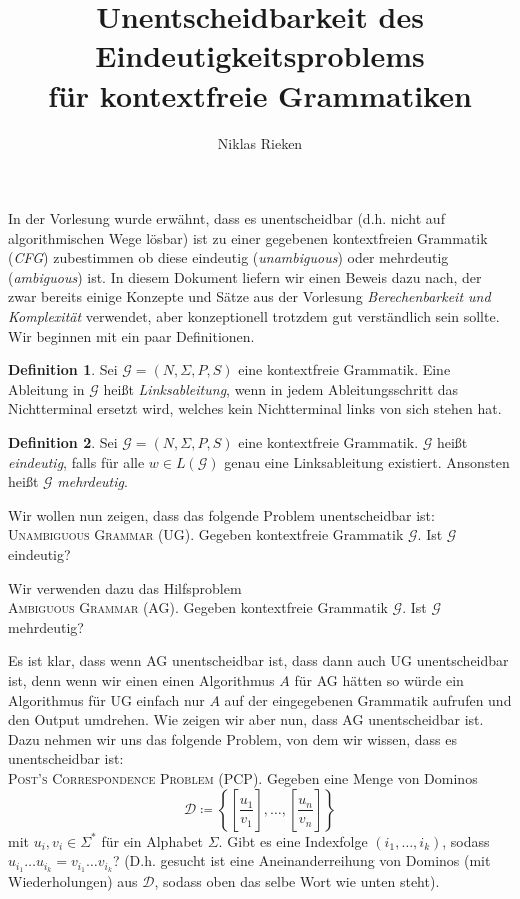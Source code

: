 \documentclass[11pt, a4paper]{article}
\author{Niklas Rieken}
\title{Unentscheidbarkeit des Eindeutigkeitsproblems\\für kontextfreie Grammatiken}
\theoremstyle{definition}
\newtheorem{definition}{Definition}
\theoremstyle{plain}
\begin{document}
\maketitle

In der Vorlesung wurde erwähnt, dass es unentscheidbar (d.h. nicht auf algorithmischen Wege lösbar) ist zu einer gegebenen kontextfreien Grammatik (\textit{CFG}) zubestimmen ob diese eindeutig (\textit{unambiguous}) oder mehrdeutig (\textit{ambiguous}) ist. In diesem Dokument liefern wir einen Beweis dazu nach, der zwar bereits einige Konzepte und Sätze aus der Vorlesung \textit{Berechenbarkeit und Komplexität} verwendet, aber konzeptionell trotzdem gut verständlich sein sollte. Wir beginnen mit ein paar Definitionen.

\begin{definition}
	Sei $\mathcal{G} = (N, \Sigma, P, S)$ eine kontextfreie Grammatik. Eine Ableitung in $\mathcal{G}$ heißt \textit{Linksableitung}, wenn in jedem Ableitungsschritt das Nichtterminal ersetzt wird, welches kein Nichtterminal links von sich stehen hat.
\end{definition}

\begin{definition}
	Sei $\mathcal{G} = (N, \Sigma, P, S)$ eine kontextfreie Grammatik. $\mathcal{G}$ heißt \textit{eindeutig}, falls für alle $w \in L(\mathcal{G})$ genau eine Linksableitung existiert. Ansonsten heißt $\mathcal{G}$ \textit{mehrdeutig}.
\end{definition}

Wir wollen nun zeigen, dass das folgende Problem unentscheidbar ist:\\
\textsc{Unambiguous Grammar (UG)}. Gegeben kontextfreie Grammatik $\mathcal{G}$. Ist $\mathcal{G}$ eindeutig?

Wir verwenden dazu das Hilfsproblem\\
\textsc{Ambiguous Grammar (AG)}. Gegeben kontextfreie Grammatik $\mathcal{G}$. Ist $\mathcal{G}$ mehrdeutig?

Es ist klar, dass wenn \textsc{AG} unentscheidbar ist, dass dann auch \textsc{UG} unentscheidbar ist, denn wenn wir einen einen Algorithmus $A$ für \textsc{AG} hätten so würde ein Algorithmus für \textsc{UG} einfach nur $A$ auf der eingegebenen Grammatik aufrufen und den Output umdrehen. Wie zeigen wir aber nun, dass \textsc{AG} unentscheidbar ist. Dazu nehmen wir uns das folgende Problem, von dem wir wissen, dass es unentscheidbar ist:\\
\textsc{Post's Correspondence Problem (PCP)}. Gegeben eine Menge von Dominos 
$$
	\mathcal{D} \coloneqq \left\lbrace \left[ \frac{u_1}{v_1} \right], \ldots, \left[ \frac{u_n}{v_n} \right] \right\rbrace
$$
mit $u_i, v_i \in \Sigma^\ast$ für ein Alphabet $\Sigma$.
Gibt es eine Indexfolge $(i_1, \ldots, i_k)$, sodass $u_{i_1} \ldots u_{i_k} = v_{i_1} \ldots v_{i_k}$? (D.h. gesucht ist eine Aneinanderreihung von Dominos (mit Wiederholungen) aus $\mathcal{D}$, sodass oben das selbe Wort wie unten steht).
\end{document}
